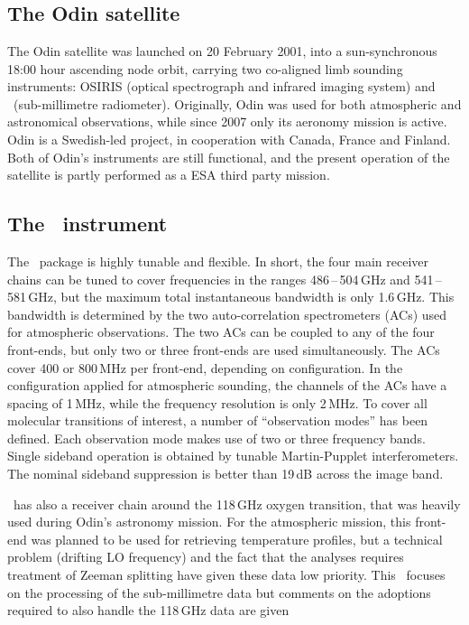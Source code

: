 \section{\smr}
\label{sec:odin}
%
\subsection{The Odin satellite}
%
The Odin satellite was launched on 20 February 2001, into a sun-synchronous
18:00 hour ascending node orbit, carrying two co-aligned limb sounding
instruments: OSIRIS (optical spectrograph and infrared imaging system) and
\SMR\ (sub-millimetre radiometer). Originally, Odin was used for both
atmospheric and astronomical observations, while since 2007 only its aeronomy
mission is active. Odin is a Swedish-led project, in cooperation with Canada,
France and Finland. Both of Odin's instruments are still functional, and the
present operation of the satellite is partly performed as a ESA third party
mission.


\subsection{The \SMR\ instrument}
%
The \smr\ package is highly tunable and flexible. In short, the four main
receiver chains can be tuned to cover frequencies in the ranges
486\,--\,504\,GHz and 541\,--\,581\,GHz, but the maximum total instantaneous
bandwidth is only 1.6\,GHz. This bandwidth is determined by the two
auto-correlation spectrometers (ACs) used for atmospheric observations. The two
ACs can be coupled to any of the four front-ends, but only two or three
front-ends are used simultaneously. The ACs cover 400 or 800\,MHz per
front-end, depending on configuration. In the configuration applied for
atmospheric sounding, the channels of the ACs have a spacing of 1\,MHz, while
the frequency resolution is only 2\,MHz. To
cover all molecular transitions of interest, a number of ``observation modes''
has been defined. Each observation mode makes use of two or three frequency
bands. Single sideband operation is obtained by tunable Martin-Pupplet
interferometers. The nominal sideband suppression is better than 19\,dB across
the image band.

\smr\ has also a receiver chain around the 118\,GHz oxygen transition, that was
heavily used during Odin's astronomy mission. For the atmospheric mission, this
front-end was planned to be used for retrieving temperature profiles, but a
technical problem (drifting LO frequency) and the fact that the analyses
requires treatment of Zeeman splitting have given these data low priority. This
\ATBD\ focuses on the processing of the sub-millimetre data but comments on the
adoptions required to also handle the 118\,GHz data are given

